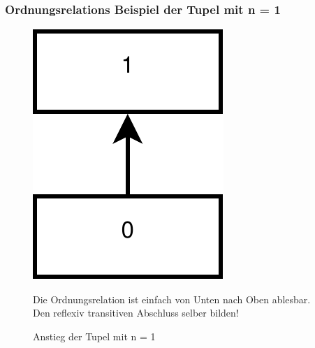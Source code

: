 \documentclass[hyperref={pdfpagelabels=false}]{beamer} %
\begin{document}
  \subsubsection*{Ordnungsrelations Beispiel der Tupel mit n = 1}
  \begin{frame}
    \begin{figure}
      \includegraphics[scale=0.30]{images/m1.pdf}
      \caption{Anstieg der Tupel mit n = 1}
      Die Ordnungsrelation ist einfach von Unten nach Oben ablesbar.\\
      Den reflexiv transitiven Abschluss selber bilden!
    \end{figure}
  \end{frame}
\end{document}
